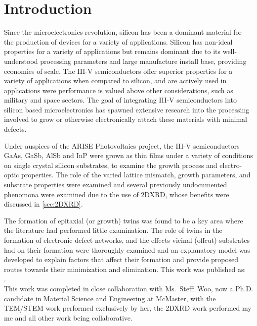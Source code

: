 \section{Introduction} \label{sec:twins}
Since the microelectronics revolution, silicon has been a dominant material for the production of devices for a variety of applications.
Silicon has non-ideal properties for a variety of applications but remains dominant due to its well-understood processing parameters and large manufacture install base, providing economies of scale.
The III-V semiconductors offer superior properties for a variety of applications when compared to silicon, and are actively used in applications were performance is valued above other considerations, such as military and space sectors.
The goal of integrating III-V semiconductors into silicon based microelectronics has spawned extensive research into the processing involved to grow or otherwise electronically attach these materials with minimal defects.

Under auspices of the ARISE Photovoltaics project, the III-V semiconductors GaAs, GaSb, AlSb and InP were grown as thin films under a variety of conditions on single crystal silicon substrates, to examine the growth process and electro-optic properties.
The role of the varied lattice mismatch, growth parameters, and substrate properties were examined and several previously undocumented phenomona were examined due to the use of 2DXRD, whose benefits were discussed in \cref{sec:2DXRD}.

The formation of epitaxial (or growth) twins was found to be a key area where the literature had performed little examination.
The role of twins in the formation of electronic defect networks, and the effects vicinal (offcut) substrates had on their formation were thoroughly examined and an explanatory model was developed to explain factors that affect their formation and provide proposed routes towards their minimization and elimination.
This work was published as:\\
 \cite{Devenyi2011}.\\
This work was completed in close collaboration with Ms.~Steffi Woo, now a Ph.D. candidate in Material Science and Engineering at McMaster, with the TEM/STEM work performed exclusively by her, the 2DXRD work performed my me and all other work being collaborative.
